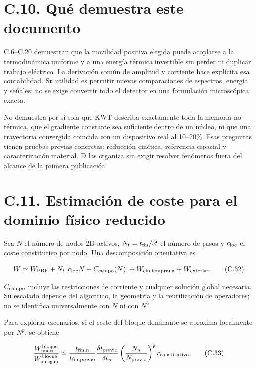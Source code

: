 \documentclass[
  spanish,
  10pt,
  a4paper,
]{article}
\begin{document}
\section{C.10. Qué demuestra este
documento}\label{c.10.-quuxe9-demuestra-este-documento}

C.6--C.20 demuestran que la movilidad positiva elegida puede acoplarse a
la termodinámica uniforme y a una energía térmica invertible sin perder
ni duplicar trabajo eléctrico. La derivación común de amplitud y
corriente hace explícita esa contabilidad. Su utilidad es permitir
nuevas comparaciones de espectros, energía y señales; no se exige
convertir todo el detector en una formulación microscópica exacta.

No demuestra por sí sola que KWT describa exactamente toda la memoria no
térmica, que el gradiente constante sea suficiente dentro de un núcleo,
ni que una trayectoria convergida coincida con un dispositivo real al
10--20\%. Esas preguntas tienen pruebas previas concretas: reducción
cinética, referencia espacial y caracterización material. D las organiza
sin exigir resolver fenómenos fuera del alcance de la primera
publicación.

\section{C.11. Estimación de coste para el dominio físico
reducido}\label{c.11.-estimaciuxf3n-de-coste-para-el-dominio-fuxedsico-reducido}

Sea \(N\) el número de nodos 2D activos, \(N_t=t_{\rm fin}/\delta t\) el
número de pasos y \(c_{\rm loc}\) el coste constitutivo por nodo. Una
descomposición orientativa es

\[
W\simeq W_{\rm PRE}+N_t\,[c_{\rm loc}N+C_{\rm campo}(N)]
+W_{\rm cin,temprana}+W_{\rm exterior}. \tag{C.32}
\]

\(C_{\rm campo}\) incluye las restricciones de corriente y cualquier
solución global necesaria. Su escalado depende del algoritmo, la
geometría y la reutilización de operadores; no se identifica
universalmente con \(N\) ni con \(N^3\).

Para explorar escenarios, si el coste del bloque dominante se aproxima
localmente por \(N^p\), se obtiene

\[
\frac{W_{\rm nuevo}^{\rm bloque}}{W_{\rm antiguo}^{\rm bloque}}
\simeq\frac{t_{\rm fin,n}}{t_{\rm fin,previo}}
\frac{\delta t_{\rm previo}}{\delta t_n}
\left(\frac{N_n}{N_{\rm previo}}\right)^p r_{\rm constitutivo}. \tag{C.33}
\]
\end{document}
